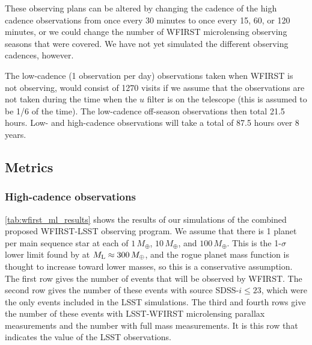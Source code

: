 These observing plans can be altered by changing the cadence of the high
cadence observations from once every 30 minutes to once every 15, 60,
or 120 minutes, or we could change the number of WFIRST microlensing
observing seasons that were covered. We have not yet simulated the
different observing cadences, however.

The low-cadence (1 observation per day) observations taken when WFIRST
is not observing, would consist of 1270 visits if we assume that
the observations are not taken during the time when the $u$ filter is
on the telescope (this is assumed to be 1/6 of the time). The low-cadence
off-season observations then total 21.5 hours. Low- and high-cadence
observations will take a total of 87.5 hours over 8 years.




\subsection{Metrics}
\label{sec:\secname:metrics}

\subsubsection{High-cadence observations}

\autoref{tab:wfirst_ml_results}
shows the results of our simulations of the combined proposed WFIRST-LSST
observing program. We assume that there is 1 planet per main sequence
star at each of $1\,M_\oplus$, $10\,M_\oplus$, and $100\,M_\oplus$.
This is the 1-$\sigma$ lower limit found by \citet{2011Natur.473..349S} at
$M_{\rm L} \approx 300\,M_\oplus$, and the rogue planet mass function is
thought to increase toward lower masses, so this is a conservative
assumption. The first row gives the number of events that will be
observed by WFIRST. The second row gives the number of these events
with source SDSS-$i \leq 23$, which were the only events included in the
LSST simulations. The third and fourth rows give the number of these events
with LSST-WFIRST microlensing parallax measurements and the number
with full mass measurements. It is this row that indicates the
value of the LSST observations.

